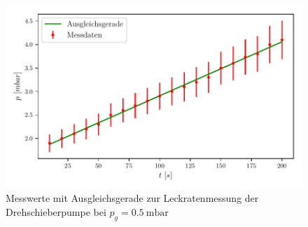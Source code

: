   \begin{figure}[H]
    \centering
    \includegraphics{build/plots/leck_dreh_0.5.pdf}
    \caption{Messwerte mit Ausgleichsgerade zur Leckratenmessung der Drehschieberpumpe bei $p_g = \SI{0.5}{\milli\bar}$}
    \label{fig:plotd1}
  \end{figure}

